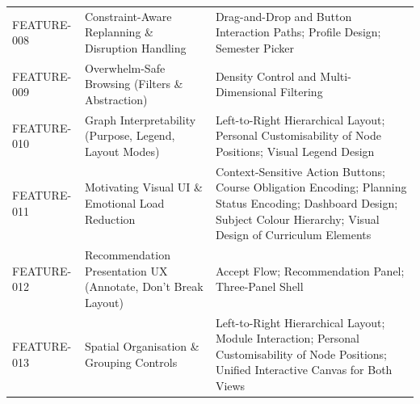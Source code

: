 \begin{longtable}{@{}p{2.4cm}p{4.7cm}p{7.0cm}@{}}
\addlinespace
FEATURE-008 & Constraint-Aware Replanning \& Disruption Handling & Drag-and-Drop and Button Interaction Paths; Profile Design; Semester Picker \\
\addlinespace
FEATURE-009 & Overwhelm-Safe Browsing (Filters \& Abstraction) & Density Control and Multi-Dimensional Filtering \\
\addlinespace
FEATURE-010 & Graph Interpretability (Purpose, Legend, Layout Modes) & Left-to-Right Hierarchical Layout; Personal Customisability of Node Positions; Visual Legend Design \\
\addlinespace
FEATURE-011 & Motivating Visual UI \& Emotional Load Reduction & Context-Sensitive Action Buttons; Course Obligation Encoding; Planning Status Encoding; Dashboard Design; Subject Colour Hierarchy; Visual Design of Curriculum Elements \\
\addlinespace
FEATURE-012 & Recommendation Presentation UX (Annotate, Don't Break Layout) & Accept Flow; Recommendation Panel; Three-Panel Shell \\
\addlinespace
FEATURE-013 & Spatial Organisation \& Grouping Controls & Left-to-Right Hierarchical Layout; Module Interaction; Personal Customisability of Node Positions; Unified Interactive Canvas for Both Views \\
\end{longtable}
\normalsize